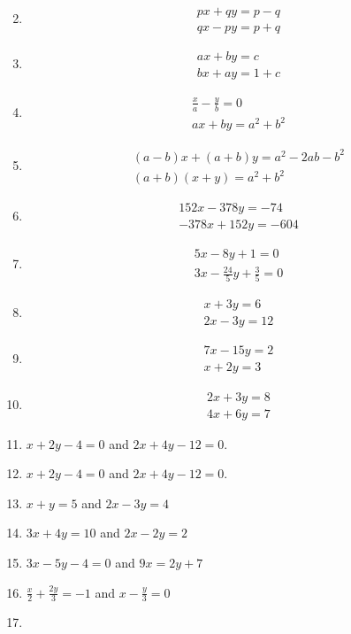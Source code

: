 \begin{enumerate}[label=\thesubsection.\arabic*,ref=\thesubsection.\theenumi]
\begin{align}
    	\end{align}
\item
\begin{align}
px+qy=p-q\\ qx-py=p+q
\end{align}
\item
\begin{align}                                                   
ax+by=c\\ bx+ay=1+c
\end{align}
\item 
\begin{align}
\frac {x}{a}-\frac{y}{b}=0\\ ax+by=a^2+b^2
\end{align}
\item
\begin{align}
(a-b)x+(a+b)y=a^2-2ab-b^2\\ (a+b)(x+y)=a^2+b^2
\end{align}
\item
\begin{align}
152x-378y=-74\\ -378x+152y=-604
\end{align}
\item
	\begin{align}
5x-8y+1 = 0 \\ 3x-\frac{24}{5}y+\frac{3}{5} = 0
\end{align}
\item 
	\begin{align}
x+3y = 6 \\  2x-3y = 12
\end{align}
\item 
	\begin{align}
7x-15y = 2 \\  x+2y = 3
\end{align}
\item 
\begin{align}
2x+3y = 8 \\ 4x+6y = 7
\end{align}
\item $x+2y-4=0$ and $2x+4y-12=0$.
\item $x+2y-4=0$ and $2x+4y-12=0$.
\item $x+y=5$ and $2x-3y=4$
\item $3x+4y=10$ and $ 2x-2y=2$
\item $3x-5y-4=0$ and $9x=2y+7$
\item $\frac{x}{2}+\frac{2y}{3}=-1$ and $x-\frac{y}{3}=0$
\item

\end{enumerate}

